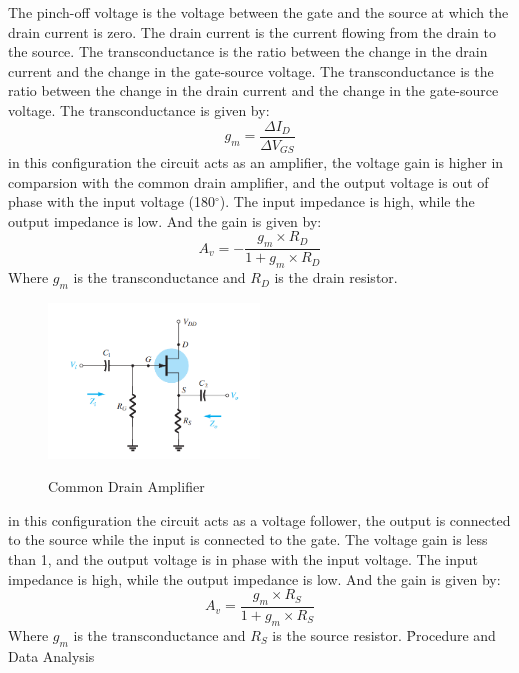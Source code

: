 \documentclass[12pt]{article}
\begin{document}
The pinch-off voltage is the voltage between the gate and the source at which the drain current is zero. The drain current is the current flowing from the drain to the source. The transconductance is the ratio between the change in the drain current and the change in the gate-source voltage.
The transconductance is the ratio between the change in the drain current and the change in the gate-source voltage. The transconductance is given by:
\begin{equation}
    g_m = \frac{\Delta I_D}{\Delta V_{GS}}
\end{equation}
in this configuration the circuit acts as an amplifier, the voltage gain is higher in comparsion with the common drain amplifier, and the output voltage is out of phase with the input voltage (180$^{\circ}$). The input impedance is high, while the output impedance is low. And the gain is given by:
\begin{equation}
    A_v = - \frac{g_m\times R_D}{1 + g_m\times R_D}
\end{equation}
Where $g_m$ is the transconductance and $R_D$ is the drain resistor. 
\begin{figure}[H]
  \centering
  \includegraphics[width=0.5\textwidth]{assets/main/2023-08-26-12-11-17.png}
  \caption{Common Drain Amplifier}
  \cite{book}
\end{figure}
in this configuration the circuit acts as a voltage follower, the output is connected to the source while the input is connected to the gate. The voltage gain is less than 1, and the output voltage is in phase with the input voltage. The input impedance is high, while the output impedance is low. And the gain is given by:
\begin{equation}
    A_v = \frac{g_m\times R_S}{1 + g_m\times R_S}
\end{equation}
Where $g_m$ is the transconductance and $R_S$ is the source resistor.
\clearpage
\h{Procedure and Data Analysis}
\end{document}
